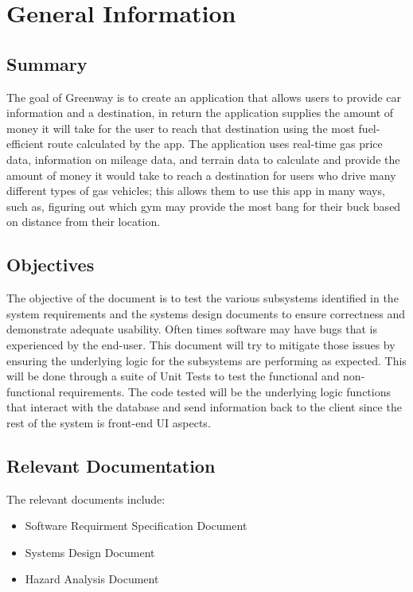 \documentclass[12pt, titlepage]{article}
\begin{document}
\section{General Information}

\subsection{Summary}


The goal of Greenway is to create an application that allows users to provide car information
and a destination, in return the application supplies the amount of money it will take for
the user to reach that destination using the most fuel-efficient route calculated by the app.
The application uses real-time gas price data, information on mileage data, and terrain data
to calculate and provide the amount of money it would take to reach a destination for users
who drive many different types of gas vehicles; this allows them to use this app in many
ways, such as, figuring out which gym may provide the most bang for their buck based on
distance from their location.

\subsection{Objectives}

The objective of the document is to test the various subsystems identified in the system requirements and the systems design documents to ensure correctness and demonstrate adequate usability. 
Often times software may have
bugs that is experienced by the end-user. This document will try to mitigate those issues by
ensuring the underlying logic for the subsystems are performing as expected. This will be
done through a suite of Unit Tests to test the functional and non-functional requirements.
The code tested will be the underlying logic functions that interact with the database and
send information back to the client since the rest of the system is front-end UI aspects.


\subsection{Relevant Documentation}


The relevant documents include:
\begin{itemize}
\item Software Requirment Specification Document
\item Systems Design Document
\item Hazard Analysis Document
\end{itemize}
\end{document}
